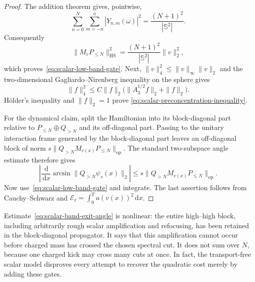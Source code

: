 \documentclass[11pt]{article}
\newcommand{\dd}{\,\mathrm d}
\theoremstyle{definition}
\theoremstyle{remark}
\begin{document}
\begin{proof}
The addition theorem gives, pointwise,
\begin{equation}
 \sum_{n=0}^N\sum_{m=-n}^n|Y_{n,m}(\omega)|^2
 =\frac{(N+1)^2}{|\mathbb S^2|}.
\end{equation}
Consequently
\begin{equation}
 \|M_vP_{\leq N}\|_{\mathrm{HS}}^2
 =\frac{(N+1)^2}{|\mathbb S^2|}\|v\|_2^2,
\end{equation}
which proves~\eqref{eq:scalar-low-band-gate}.  Next,
$\|v\|_4^2\leq\|v\|_\infty\|v\|_2$ and the two-dimensional
Gagliardo--Nirenberg inequality on the sphere gives
\begin{equation}
 \|f\|_4^2\leq C\|f\|_2
 \bigl(\|A_3^{1/2}f\|_2+\|f\|_2\bigr).
\end{equation}
Hölder's inequality and $\|f\|_2=1$ prove
\eqref{eq:scalar-preconcentration-inequality}.

For the dynamical claim, split the Hamiltonian into its block-diagonal part
relative to $P_{\leq N}\oplus Q_{>N}$ and its off-diagonal part.  Passing to
the unitary interaction frame generated by the block-diagonal part leaves an
off-diagonal block of norm
$s\|Q_{>N}M_{v(x)}P_{\leq N}\|_{\mathrm{op}}$.  The standard two-subspace
angle estimate therefore gives
\begin{equation}
 \left|\frac{\dd}{\dd x}
 \arcsin\|Q_{>N}\psi_s(x)\|_2\right|
 \leq s\|Q_{>N}M_{v(x)}P_{\leq N}\|_{\mathrm{op}}.
\end{equation}
Now use~\eqref{eq:scalar-low-band-gate} and integrate.  The last assertion
follows from Cauchy--Schwarz and
$\mathcal E_\ell=\int_0^Ta(v(x))^2\dd x$.
\end{proof}

Estimate~\eqref{eq:scalar-band-exit-angle} is nonlinear: the entire
high--high block, including arbitrarily rough scalar amplification and
refocusing, has been retained in the block-diagonal propagator.  It says that
this amplification cannot occur before charged mass has crossed the chosen
spectral cut.  It does not sum over $N$, because one charged kick may cross
many cuts at once.  In fact, the transport-free scalar model disproves every
attempt to recover the quadratic cost merely by adding these gates.
\end{document}
